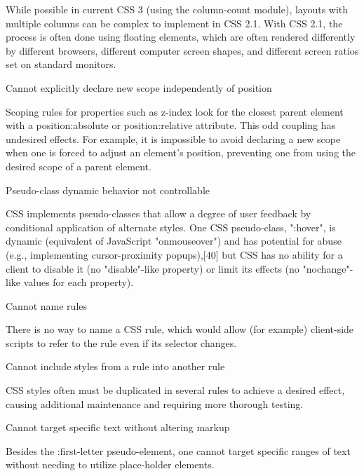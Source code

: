 \begin{compactitem}
While possible in current CSS 3 (using the column-count module), layouts with multiple columns can be complex to implement in CSS 2.1. With CSS 2.1, the process is often done using floating elements, which are often rendered differently by different browsers, different computer screen shapes, and different screen ratios set on standard monitors.

\item Cannot explicitly declare new scope independently of position 

Scoping rules for properties such as z-index look for the closest parent element with a position:absolute or position:relative attribute. This odd coupling has undesired effects. For example, it is impossible to avoid declaring a new scope when one is forced to adjust an element's position, preventing one from using the desired scope of a parent element.

\item Pseudo-class dynamic behavior not controllable 

CSS implements pseudo-classes that allow a degree of user feedback by conditional application of alternate styles. One CSS pseudo-class, ":hover", is dynamic (equivalent of JavaScript "onmouseover") and has potential for abuse (e.g., implementing cursor-proximity popups),[40] but CSS has no ability for a client to disable it (no "disable"-like property) or limit its effects (no "nochange"-like values for each property).

\item Cannot name rules 

There is no way to name a CSS rule, which would allow (for example) client-side scripts to refer to the rule even if its selector changes.

\item Cannot include styles from a rule into another rule 

CSS styles often must be duplicated in several rules to achieve a desired effect, causing additional maintenance and requiring more thorough testing.

\item Cannot target specific text without altering markup 

Besides the :first-letter pseudo-element, one cannot target specific ranges of text without needing to utilize place-holder elements.

\end{compactitem}




